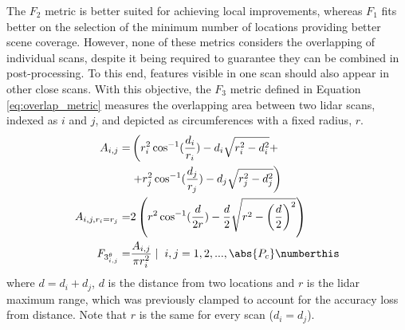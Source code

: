 The $F_2$ metric is better suited for achieving local improvements, whereas $F_1$ fits better on the selection of the minimum number of locations providing better scene coverage. However, none of these metrics considers the overlapping of individual scans, despite it being required to guarantee they can be combined in post-processing. To this end, features visible in one scan should also appear in other close scans. With this objective, the $F_3$ metric defined in Equation \ref{eq:overlap_metric} measures the overlapping area between two \acrshort{lidar} scans, indexed as $i$ and $j$, and depicted as circumferences with a fixed radius, $r$.  
\begin{align*}
    A_{i, j} =& \left(r_{i}^{2} \cos^{-1}(\frac{d_i}{r_{i}}) - d_i \sqrt{r_{i}^2 - d_{i}^{2}} +\right. \\
    &\left.+ r_{j}^{2} \cos^{-1}(\frac{d_j}{r_{j}}) - d_j \sqrt{r_{j}^2 - d_{j}^{2}}\right)\\  
    A_{i, j, r_i = r_j} =& 2\left(r^{2} \cos^{-1}(\frac{d}{2r}) - \frac{d}{2} \sqrt{r^2 - \left(\frac{d}{2}\right)^{2}}\right)\\
    \textit{F}_{3_{i, j}^\theta} =& \frac{A_{i, j}}{\pi r_{i}^2} \hspace{1mm} | \hspace{2mm} i, j = 1, 2, ..., \abs{P_c}
    \numberthis \label{eq:overlap_metric}
\end{align*}
where $d = d_i + d_j$, $d$ is the distance from two locations and $r$ is the \acrshort{lidar} maximum range, which was previously clamped to account for the accuracy loss from distance. Note that $r$ is the same for every scan ($d_i = d_j$).

